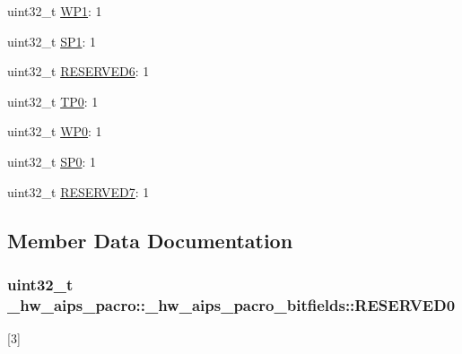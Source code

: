 \begin{DoxyCompactItemize}
\item 
uint32\+\_\+t \hyperlink{struct__hw__aips__pacro_1_1__hw__aips__pacro__bitfields_adef34b4f3f519adb32c6a3fc822e897a}{W\+P1}\+: 1
\item 
uint32\+\_\+t \hyperlink{struct__hw__aips__pacro_1_1__hw__aips__pacro__bitfields_a008a2bd257dacb935e72d2fab2a91d5f}{S\+P1}\+: 1
\item 
uint32\+\_\+t \hyperlink{struct__hw__aips__pacro_1_1__hw__aips__pacro__bitfields_ad313f1998ac82e222956114bdaf2f0a4}{R\+E\+S\+E\+R\+V\+E\+D6}\+: 1
\item 
uint32\+\_\+t \hyperlink{struct__hw__aips__pacro_1_1__hw__aips__pacro__bitfields_adda27f19198f7b0c0b8d2ee4b23985cf}{T\+P0}\+: 1
\item 
uint32\+\_\+t \hyperlink{struct__hw__aips__pacro_1_1__hw__aips__pacro__bitfields_a84dab855689a9a90ac2efa89370305d7}{W\+P0}\+: 1
\item 
uint32\+\_\+t \hyperlink{struct__hw__aips__pacro_1_1__hw__aips__pacro__bitfields_a9245fbf9531858d7c1f7ef61186402f2}{S\+P0}\+: 1
\item 
uint32\+\_\+t \hyperlink{struct__hw__aips__pacro_1_1__hw__aips__pacro__bitfields_a4879515b95b6a8d0d80c9dca0f6848bb}{R\+E\+S\+E\+R\+V\+E\+D7}\+: 1
\end{DoxyCompactItemize}


\subsection{Member Data Documentation}
\subsubsection[{\texorpdfstring{R\+E\+S\+E\+R\+V\+E\+D0}{RESERVED0}}]{\setlength{\rightskip}{0pt plus 5cm}uint32\+\_\+t \+\_\+hw\+\_\+aips\+\_\+pacro\+::\+\_\+hw\+\_\+aips\+\_\+pacro\+\_\+bitfields\+::\+R\+E\+S\+E\+R\+V\+E\+D0}\hypertarget{struct__hw__aips__pacro_1_1__hw__aips__pacro__bitfields_a56ad49abc8e408a144058ede996b6135}{}\label{struct__hw__aips__pacro_1_1__hw__aips__pacro__bitfields_a56ad49abc8e408a144058ede996b6135}
\mbox{[}3\mbox{]} 
